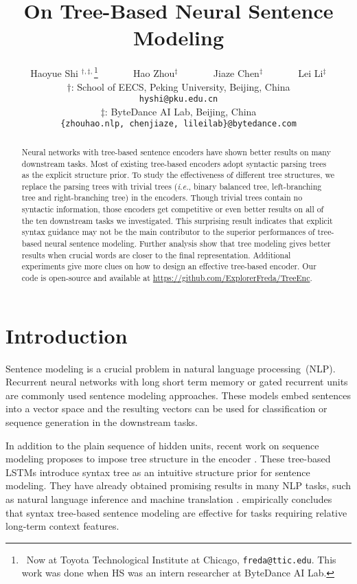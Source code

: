 \documentclass[11pt,a4paper]{article}
\title{On Tree-Based Neural Sentence Modeling}
\author{Haoyue Shi $^{\dagger, \ddagger, }$\thanks{~Now at Toyota Technological Institute at Chicago, {\tt freda@ttic.edu}. This work was done when HS was an intern researcher at ByteDance AI Lab. } ~~~~~~ Hao Zhou$^{\ddagger}$ ~~~~~~ Jiaze Chen$^{\ddagger}$ ~~~~~~ Lei Li$^{ \ddagger}$ \\
$\dagger$: School of EECS, Peking University, Beijing, China \\
{\tt hyshi@pku.edu.cn}
\\
$\ddagger$: ByteDance AI Lab, Beijing, China \\
{\tt \{zhouhao.nlp, chenjiaze, lileilab\}@bytedance.com}}
\date{}
\begin{document}
\maketitle
\begin{abstract}
Neural networks with tree-based sentence encoders have shown better results on many downstream tasks.
Most of existing tree-based encoders adopt 
syntactic parsing trees as the explicit structure prior. 
To study the effectiveness of different tree structures, we replace the parsing trees with trivial trees (\textit{i.e.}, binary balanced tree, left-branching tree and right-branching tree) in the encoders. 
Though trivial trees contain no syntactic information, 
those encoders get competitive or even better results on all of the ten downstream tasks we investigated. 
This surprising result indicates that explicit syntax guidance may not be the main contributor to the superior performances of tree-based neural sentence modeling.
Further analysis show that tree modeling gives better results when crucial words are closer to the final representation.
Additional experiments give more clues on how to design an effective tree-based encoder.
Our code is open-source and available at \url{https://github.com/ExplorerFreda/TreeEnc}. 
\end{abstract}


\section{Introduction}

Sentence modeling is a crucial problem in natural language processing~(NLP).
Recurrent neural networks with long short term memory \cite{hochreiter1997long} or gated recurrent units  \cite{cho2014learning}
are commonly used sentence modeling approaches. 
These models embed sentences into a vector space and the resulting vectors can be used for classification or sequence generation in the downstream tasks.

In addition to the plain sequence of hidden units, recent work on sequence modeling proposes to impose tree structure 
in the encoder \cite{socher2013recursive,tai2015improved,zhu2015long}. 
These tree-based LSTMs introduce syntax tree as an intuitive structure prior for sentence modeling.
They have already obtained promising results in many NLP tasks, such as natural language inference \cite{bowman2016fast,chen2017enhanced} and machine translation \cite{eriguchi2016tree,chen2017improved,chen2017neural,P17-2092}.
 empirically concludes that syntax tree-based sentence modeling are effective for tasks requiring relative long-term context features.
\end{document}
